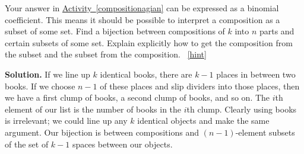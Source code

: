 \documentclass{book}
\begin{document}
\setcounter{project}{129}
\addtocounter{project}{-1}
\begin{activity}[]\label{activity-122}
\hypertarget{p-917}{}%
Your answer in \hyperref[compositionagian]{Activity~\ref{compositionagian}} can be expressed as a binomial coefficient. This means it should be possible to interpret a composition as a subset of some set. Find a bijection between compositions of \(k\) into \(n\) parts and certain subsets of some set.  Explain explicitly how to get the composition from the subset and the subset from the composition.%
~\hfill{\tiny\hyperlink{a-129}{[hint]}\hypertarget{q-129}{}}\par\smallskip%
\noindent\textbf{Solution.}\hypertarget{solution-103}{}\quad%
\hypertarget{p-919}{}%
If we line up \(k\) identical books, there are \(k-1\) places in between two books. If we choose \(n-1\) of these places and slip dividers into those places, then we have a first clump of books, a second clump of books, and so on. The \(i\)th element of our list is the number of books in the \(i\)th clump. Clearly using books is irrelevant; we could line up any \(k\) identical objects and make the same argument. Our bijection is between compositions and \((n-1)\)-element subsets of the set of \(k-1\) spaces between our objects.%
\end{activity}
\end{document}
